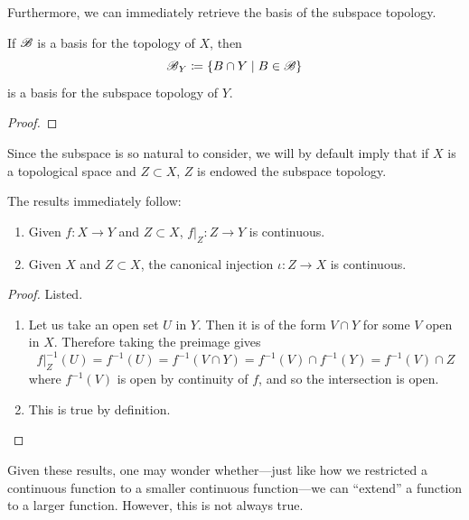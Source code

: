   Furthermore, we can immediately retrieve the basis of the subspace topology. 

  \begin{theorem}
    If $\B$ is a basis for the topology of $X$, then 
    \begin{equation}
      \B_Y \coloneqq \{B \cap Y \mid B \in \B \} 
    \end{equation}
    is a basis for the subspace topology of $Y$. 
  \end{theorem}
  \begin{proof}
    
  \end{proof}

  Since the subspace is so natural to consider, we will by default imply that if $X$ is a topological space and $Z \subset X$, $Z$ is endowed the subspace topology. 

  \begin{lemma}
    The results immediately follow: 
    \begin{enumerate}
      \item Given $f: X \rightarrow Y$ and $Z \subset X$, $f|_{Z} : Z \rightarrow Y$ is continuous. 
      \item Given $X$ and $Z \subset X$, the canonical injection $\iota: Z \rightarrow X$ is continuous. 
    \end{enumerate}
  \end{lemma}
  \begin{proof}
    Listed. 
    \begin{enumerate}
      \item Let us take an open set $U$ in $Y$. Then it is of the form $V \cap Y$ for some $V$ open in $X$. Therefore taking the preimage gives 
      \begin{equation}
        f|_{Z}^{-1} (U) = f^{-1} (U) = f^{-1} (V \cap Y) = f^{-1} (V) \cap f^{-1} (Y) = f^{-1} (V) \cap Z
      \end{equation}
      where $f^{-1} (V)$ is open by continuity of $f$, and so the intersection is open. 

      \item This is true by definition. 
    \end{enumerate}
  \end{proof}

  Given these results, one may wonder whether---just like how we restricted a continuous function to a smaller continuous function---we can ``extend'' a function to a larger function. However, this is not always true. 

